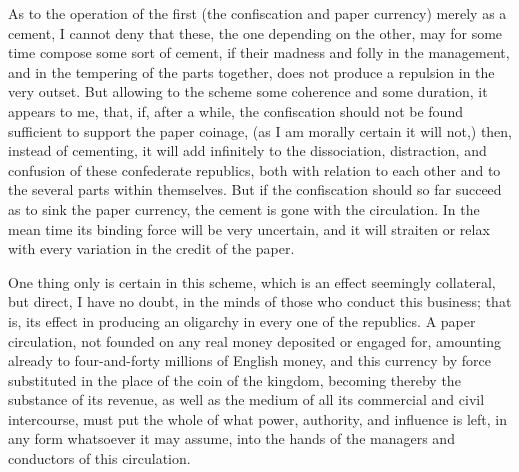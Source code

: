 As to the operation of the first (the confiscation and paper currency) merely as a cement, I cannot deny that these, the one depending on the other, may for some time compose some sort of cement, if their madness and folly in the management, and in the tempering of the parts together, does not produce a repulsion in the very outset. But allowing to the scheme some coherence and some duration, it appears to me, that, if, after a while, the confiscation should not be found sufficient to support the paper coinage, (as I am morally certain it will not,) then, instead of cementing, it will add infinitely to the dissociation, distraction, and confusion of these confederate republics, both with relation to each other and to the several parts within themselves. But if the confiscation should so far succeed as to sink the paper currency, the cement is gone with the circulation. In the mean time its binding force will be very uncertain, and it will straiten or relax with every variation in the credit of the paper.

One thing only is certain in this scheme, which is an effect seemingly collateral, but direct, I have no doubt, in the minds of those who conduct this business; that is, its effect in producing an oligarchy in every one of the republics. A paper circulation, not founded on any real money deposited or engaged for, amounting already to four-and-forty millions of English money, and this currency by force substituted in the place of the coin of the kingdom, becoming thereby the substance of its revenue, as well as the medium of all its commercial and civil intercourse, must put the whole of what power, authority, and influence is left, in any form whatsoever it may assume, into the hands of the managers and conductors of this circulation.

